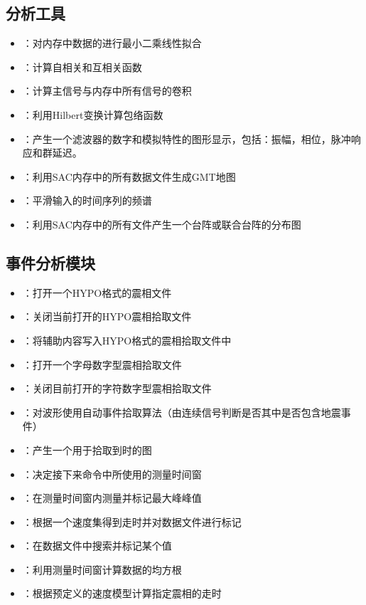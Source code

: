 \subsection*{分析工具}
\begin{itemize}
\item {}：对内存中数据的进行最小二乘线性拟合
\item {}：计算自相关和互相关函数
\item {}：计算主信号与内存中所有信号的卷积
\item {}：利用Hilbert变换计算包络函数
\item {}：产生一个滤波器的数字和模拟特性的图形显示，包括：振幅，相位，脉冲响应和群延迟。
\item {}：利用SAC内存中的所有数据文件生成GMT地图
\item {}：平滑输入的时间序列的频谱
\item {}：利用SAC内存中的所有文件产生一个台阵或联合台阵的分布图
\end{itemize}

\subsection*{事件分析模块}
\begin{itemize}
\item {}：打开一个HYPO格式的震相文件
\item {}：关闭当前打开的HYPO震相拾取文件
\item {}：将辅助内容写入HYPO格式的震相拾取文件中
\item {}：打开一个字母数字型震相拾取文件
\item {}：关闭目前打开的字符数字型震相拾取文件
\item {}：对波形使用自动事件拾取算法（由连续信号判断是否其中是否包含地震事件）
\item {}：产生一个用于拾取到时的图
\item {}：决定接下来命令中所使用的测量时间窗
\item {}：在测量时间窗内测量并标记最大峰峰值
\item {}：根据一个速度集得到走时并对数据文件进行标记
\item {}：在数据文件中搜索并标记某个值
\item {}：利用测量时间窗计算数据的均方根
\item {}：根据预定义的速度模型计算指定震相的走时
\end{itemize}

